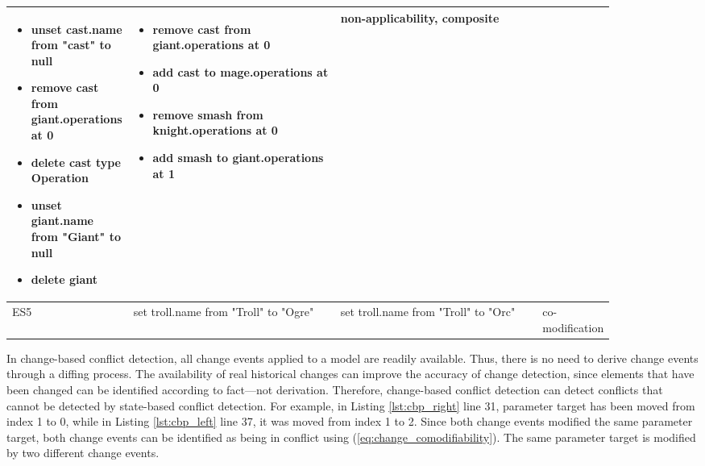 \begin{table*}[ht]
\begin{scriptsize}
\begin{tabular}{|p{0.04\linewidth}|p{0.36\linewidth}|p{0.36\linewidth}|
        p{0.11\linewidth}|}
\begin{minipage}[t]{\linewidth}
        \begin{itemize}[leftmargin=0pt]
          \setlength
          \item[] unset cast.name from "cast" to null
          \item[] remove cast from giant.operations at 0
          \item[] delete cast type Operation
          \item[] unset giant.name from "Giant" to null
          \item[] delete giant
        \end{itemize}
      \end{minipage}
      &
      \begin{minipage}[t]{\linewidth}
        \raggedright
        \begin{itemize}[leftmargin=0pt]
          \setlength
          \item[] remove cast from giant.operations at 0
          \item[] add cast to mage.operations at 0
          \item[] remove smash from knight.operations at 0
          \item[] add smash to giant.operations at 1
        \end{itemize}
      \end{minipage}
      &
      non-applicability, composite\\
      \hline
      ES5 &
      set troll.name from "Troll" to "Ogre" &
      set troll.name from "Troll" to "Orc" &
      co-modification\\
      \hline
    \end{tabular}
  \end{scriptsize}
\end{table*}

In change-based conflict detection, all change events applied to a model are readily available. Thus, there is no need to derive change events through a diffing process. The availability of real historical changes can improve the accuracy of change detection, since elements that have been changed can be identified according to fact—not derivation. Therefore, change-based conflict detection can detect conflicts that cannot be detected by state-based conflict detection. For example, in Listing \ref{lst:cbp_right} line 31, parameter \textsf{target} has been moved from index 1 to 0, while in Listing \ref{lst:cbp_left} line 37, it was moved from index 1 to 2. Since both change events modified the same parameter \textsf{target}, both change events can be identified as being in conflict using (\ref{eq:change_comodifiability}). The same parameter \textsf{target} is modified by two different change events.

